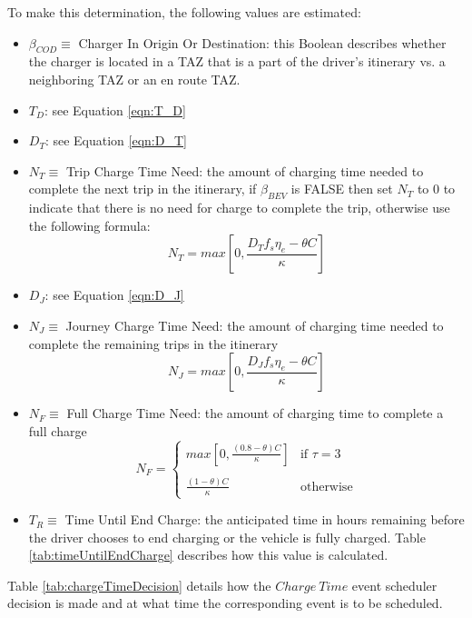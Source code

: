 \documentclass[journal]{IEEEtran}
\begin{document}
To make this determination, the following values are estimated: 
\begin{itemize}
  \item	$\beta_{COD} \equiv$ Charger In Origin Or Destination: this Boolean describes whether the charger is located in a TAZ that is a part of the driver's itinerary vs. a neighboring TAZ or an en route TAZ.
  \item	$T_D$: see Equation \ref{eqn:T_D}
  \item	$D_T$: see Equation \ref{eqn:D_T}
  \item	$N_T \equiv$ Trip Charge Time Need: the amount of charging time needed to complete the next trip in the itinerary, if $\beta_{BEV}$ is FALSE then set $N_T$ to 0 to indicate that there is no need for charge to complete the trip, otherwise use the following formula:
    \begin{equation} N_T = max\left[0,\frac{D_T f_s \eta_e - \theta C}{\kappa} \right]
    \end{equation}
  \item	$D_J$: see Equation \ref{eqn:D_J} 
  \item	$N_J \equiv$ Journey Charge Time Need: the amount of charging time needed to complete the remaining trips in the itinerary
    \begin{equation}
      N_J = max\left[0,\frac{D_J f_s \eta_e - \theta C}{\kappa} \right]
    \end{equation}
  \item	$N_F \equiv$ Full Charge Time Need: the amount of charging time to complete a full charge
    \begin{equation}
      N_F = 
      \begin{cases}
	max\left[0,\frac{(0.8 - \theta) C }{\kappa}\right] & \text{if }\tau = 3 \\
	~ \\
	\frac{(1 - \theta) C }{\kappa} & \text{otherwise}
      \end{cases}
    \end{equation}
  \item	$T_R \equiv$ Time Until End Charge: the anticipated time in hours remaining before the driver chooses to end charging or the vehicle is fully charged.  Table \ref{tab:timeUntilEndCharge} describes how this value is calculated. 
\end{itemize}

Table \ref{tab:chargeTimeDecision} details how the $Charge ~Time$ event scheduler decision is made and at what time the corresponding event is to be scheduled.
\end{document}

